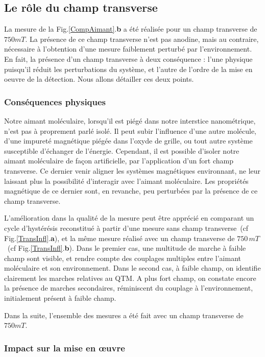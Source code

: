\subsection{Le r\^ole du champ transverse}

La mesure de la Fig.\ref{CompAimant}.\textbf{b} a été réalisée pour un champ transverse de $750mT$. La présence de ce champ transverse n'est pas anodine, mais au contraire, nécessaire à l'obtention d'une mesure faiblement perturbé par l'environnement. En fait, la présence d'un champ transverse à deux conséquence : l'une physique puisqu'il réduit les perturbations du système, et l'autre de l'ordre de la mise en oeuvre de la détection. Nous allons détailler ces deux points.

\subsubsection{Conséquences physiques}
Notre aimant moléculaire, lorsqu'il est piégé dans notre interstice nanométrique, n'est pas à proprement parlé isolé. Il peut subir l'influence d'une autre molécule, d'une impureté magnétique piégée dans l'oxyde de grille, ou tout autre système susceptible d'échanger de l'énergie. Cependant, il est possible d'isoler notre aimant moléculaire de façon artificielle, par l'application d'un fort champ transverse. Ce dernier venir aligner les systèmes magnétiques environnant, ne leur laissant plus la possibilité d'interagir avec l'aimant moléculaire. Les propriétés magnétique de ce dernier sont, en revanche, peu perturbées par la présence de ce champ transverse.

L'amélioration dans la qualité de la mesure peut être apprécié en comparant un cycle d'hystérésis reconstitué à partir d'une mesure sans champ transverse~(cf Fig.\ref{TransInfl}.\textbf{a}), et la même mesure réalisé avec un champ transverse de $750\,mT$~(cf Fig.\ref{TransInfl}.\textbf{b}). Dans le premier cas, une multitude de marche à faible champ sont visible, et rendre compte des couplages multiples entre l'aimant moléculaire et son environnement. Dans le second cas, à faible champ, on identifie clairement les marches relatives au QTM. A plus fort champ, on constate encore la présence de marches secondaires, réminiscent du couplage à l'environnement, initialement présent à faible champ.

Dans la suite, l'ensemble des mesures a été fait avec un champ transverse de $750mT$.

\subsubsection{Impact sur la mise en œuvre}

